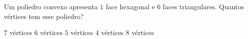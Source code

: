 Um poliedro convexo apresenta $1$ face hexagonal e $6$ faces triangulares. Quantos vértices tem esse poliedro?

$7$ vértices
$6$ vértices
$5$ vértices
$4$ vértices
$8$ vértices


